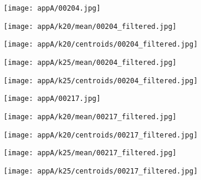 \documentclass[draft,final]{vutinfth} %
\begin{document}
\begin{appendices}
\begin{figure}[h]
\centering
  \begin{subfigure}[b]{0.19\columnwidth}
    \centering
    \texttt{[image: appA/00204.jpg]}
  \end{subfigure}
  \begin{subfigure}[b]{0.19\columnwidth}
    \centering
    \texttt{[image: appA/k20/mean/00204\_filtered.jpg]}
  \end{subfigure}
  \begin{subfigure}[b]{0.19\columnwidth}
    \centering
    \texttt{[image: appA/k20/centroids/00204\_filtered.jpg]}
  \end{subfigure}
  \begin{subfigure}[b]{0.19\columnwidth}
    \centering
    \texttt{[image: appA/k25/mean/00204\_filtered.jpg]}
  \end{subfigure}
  \begin{subfigure}[b]{0.19\columnwidth}
    \centering
    \texttt{[image: appA/k25/centroids/00204\_filtered.jpg]}
  \end{subfigure}
\caption{}
  \label{appA:204}
\end{figure}  

\begin{figure}[h]
\centering
  \begin{subfigure}[b]{0.19\columnwidth}
    \centering
    \texttt{[image: appA/00217.jpg]}
  \end{subfigure}
  \begin{subfigure}[b]{0.19\columnwidth}
    \centering
    \texttt{[image: appA/k20/mean/00217\_filtered.jpg]}
  \end{subfigure}
  \begin{subfigure}[b]{0.19\columnwidth}
    \centering
    \texttt{[image: appA/k20/centroids/00217\_filtered.jpg]}
  \end{subfigure}
  \begin{subfigure}[b]{0.19\columnwidth}
    \centering
    \texttt{[image: appA/k25/mean/00217\_filtered.jpg]}
  \end{subfigure}
  \begin{subfigure}[b]{0.19\columnwidth}
    \centering
    \texttt{[image: appA/k25/centroids/00217\_filtered.jpg]}
  \end{subfigure}
\caption{}
\label{appA:217}
\end{figure}  


\end{appendices}
\end{document}
